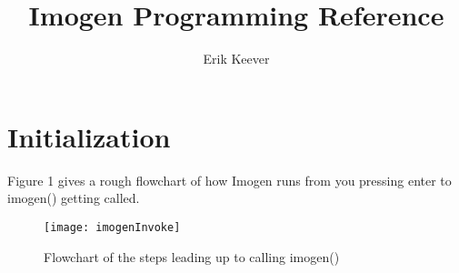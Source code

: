 \documentclass[letterpaper,12pt]{article}
\author{Erik Keever}
\title{Imogen Programming Reference}
\begin{document}
\maketitle

\section{Initialization}

Figure 1 gives a rough flowchart of how Imogen runs from you pressing enter to imogen() getting called.

\begin{figure}[h]
\texttt{[image: imogenInvoke]}
\caption{Flowchart of the steps leading up to calling imogen()}
\end{figure}
\end{document}
